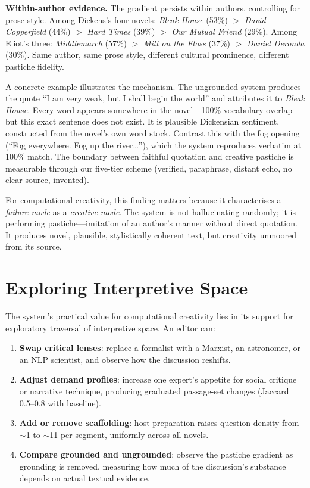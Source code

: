 \documentclass[letterpaper]{article}
\begin{document}
\textbf{Within-author evidence.}  The gradient persists within
authors, controlling for prose style.  Among Dickens's four novels:
\emph{Bleak House} (53\%) $>$ \emph{David Copperfield} (44\%) $>$
\emph{Hard Times} (39\%) $>$ \emph{Our Mutual Friend} (29\%).  Among
Eliot's three: \emph{Middlemarch} (57\%) $>$ \emph{Mill on the Floss}
(37\%) $>$ \emph{Daniel Deronda} (30\%).  Same author, same prose
style, different cultural prominence, different pastiche fidelity.

A concrete example illustrates the mechanism.  The ungrounded system
produces the quote ``I am very weak, but I shall begin the world''
and attributes it to \emph{Bleak House}.  Every word appears somewhere
in the novel---100\% vocabulary overlap---but this exact sentence does
not exist.  It is plausible Dickensian sentiment, constructed from the
novel's own word stock.  Contrast this with the fog opening (``Fog
everywhere.  Fog up the river\ldots''), which the system reproduces
verbatim at 100\% match.  The boundary between faithful quotation and
creative pastiche is measurable through our five-tier scheme (verified,
paraphrase, distant echo, no clear source, invented).

For computational creativity, this finding matters because it
characterises a \emph{failure mode} as a \emph{creative mode}.  The
system is not hallucinating randomly; it is performing pastiche---imitation
of an author's manner without direct quotation.  It produces novel,
plausible, stylistically coherent text, but creativity unmoored from
its source.

\section{Exploring Interpretive Space}

The system's practical value for computational creativity lies in its
support for exploratory traversal of interpretive space.  An editor
can:

\begin{enumerate}
\item \textbf{Swap critical lenses}: replace a formalist with a
Marxist, an astronomer, or an NLP scientist, and observe how the
discussion reshifts.

\item \textbf{Adjust demand profiles}: increase one expert's appetite
for social critique or narrative technique, producing graduated
passage-set changes (Jaccard 0.5--0.8 with baseline).

\item \textbf{Add or remove scaffolding}: host preparation raises
question density from $\sim$1 to $\sim$11 per segment, uniformly
across all novels.

\item \textbf{Compare grounded and ungrounded}: observe the pastiche
gradient as grounding is removed, measuring how much of the
discussion's substance depends on actual textual evidence.
\end{enumerate}
\end{document}
